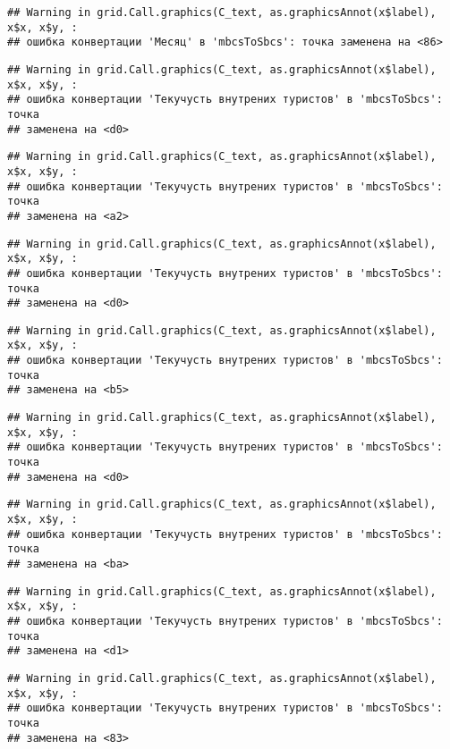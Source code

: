 \documentclass[
]{article}
\begin{document}
\begin{verbatim}
## Warning in grid.Call.graphics(C_text, as.graphicsAnnot(x$label), x$x, x$y, :
## ошибка конвертации 'Месяц' в 'mbcsToSbcs': точка заменена на <86>
\end{verbatim}

\begin{verbatim}
## Warning in grid.Call.graphics(C_text, as.graphicsAnnot(x$label), x$x, x$y, :
## ошибка конвертации 'Текучусть внутрених туристов' в 'mbcsToSbcs': точка
## заменена на <d0>
\end{verbatim}

\begin{verbatim}
## Warning in grid.Call.graphics(C_text, as.graphicsAnnot(x$label), x$x, x$y, :
## ошибка конвертации 'Текучусть внутрених туристов' в 'mbcsToSbcs': точка
## заменена на <a2>
\end{verbatim}

\begin{verbatim}
## Warning in grid.Call.graphics(C_text, as.graphicsAnnot(x$label), x$x, x$y, :
## ошибка конвертации 'Текучусть внутрених туристов' в 'mbcsToSbcs': точка
## заменена на <d0>
\end{verbatim}

\begin{verbatim}
## Warning in grid.Call.graphics(C_text, as.graphicsAnnot(x$label), x$x, x$y, :
## ошибка конвертации 'Текучусть внутрених туристов' в 'mbcsToSbcs': точка
## заменена на <b5>
\end{verbatim}

\begin{verbatim}
## Warning in grid.Call.graphics(C_text, as.graphicsAnnot(x$label), x$x, x$y, :
## ошибка конвертации 'Текучусть внутрених туристов' в 'mbcsToSbcs': точка
## заменена на <d0>
\end{verbatim}

\begin{verbatim}
## Warning in grid.Call.graphics(C_text, as.graphicsAnnot(x$label), x$x, x$y, :
## ошибка конвертации 'Текучусть внутрених туристов' в 'mbcsToSbcs': точка
## заменена на <ba>
\end{verbatim}

\begin{verbatim}
## Warning in grid.Call.graphics(C_text, as.graphicsAnnot(x$label), x$x, x$y, :
## ошибка конвертации 'Текучусть внутрених туристов' в 'mbcsToSbcs': точка
## заменена на <d1>
\end{verbatim}

\begin{verbatim}
## Warning in grid.Call.graphics(C_text, as.graphicsAnnot(x$label), x$x, x$y, :
## ошибка конвертации 'Текучусть внутрених туристов' в 'mbcsToSbcs': точка
## заменена на <83>
\end{verbatim}
\end{document}
